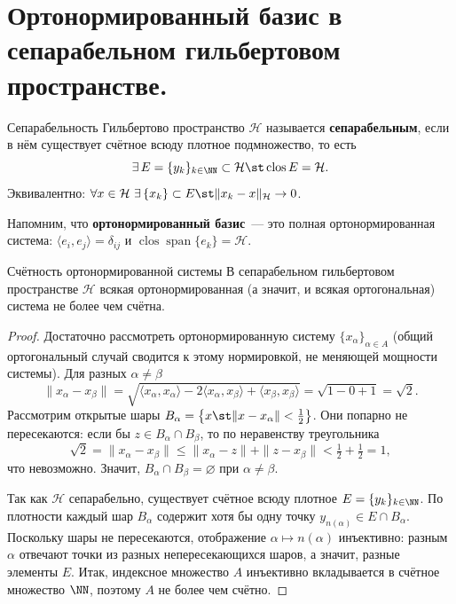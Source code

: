
\section{Ортонормированный базис в сепарабельном гильбертовом пространстве.}

\begin{Definition}{Сепарабельность}{}
	Гильбертово пространство $\mathcal{H}$ называется \textbf{сепарабельным}, если в нём существует счётное всюду плотное подмножество, то есть
	\[
	\exists\, E = \{y_k\}_{k \in \NN} \subset \mathcal{H} \st \operatorname{clos} E = \mathcal{H}.
	\]
	Эквивалентно: $\forall x \in \mathcal{H}\ \exists\,\{x_k\} \subset E \st \|x_k - x\|_{\mathcal{H}} \to 0$.
\end{Definition}

Напомним, что \textbf{ортонормированный базис}~--- это полная ортонормированная система: $\langle e_i, e_j\rangle = \delta_{ij}$ и $\operatorname{clos}\operatorname{span}\{e_k\} = \mathcal{H}$.

\begin{Theorem}{Счётность ортонормированной системы}{}
	В сепарабельном гильбертовом пространстве $\mathcal{H}$ всякая ортонормированная (а значит, и всякая ортогональная) система не более чем счётна.
\end{Theorem}

\begin{proof}
	Достаточно рассмотреть ортонормированную систему $\{x_\alpha\}_{\alpha \in A}$ (общий ортогональный случай сводится к этому нормировкой, не меняющей мощности системы). Для разных $\alpha \neq \beta$
	\[
	\|x_\alpha - x_\beta\|
	= \sqrt{\langle x_\alpha, x_\alpha\rangle - 2\langle x_\alpha, x_\beta\rangle + \langle x_\beta, x_\beta\rangle}
	= \sqrt{1 - 0 + 1} = \sqrt{2}.
	\]
	Рассмотрим открытые шары $B_\alpha = \bigl\{ x \st \|x - x_\alpha\| < \tfrac12 \bigr\}$. Они попарно не пересекаются: если бы $z \in B_\alpha \cap B_\beta$, то по неравенству треугольника
	\[
	\sqrt{2} = \|x_\alpha - x_\beta\| \le \|x_\alpha - z\| + \|z - x_\beta\| < \tfrac12 + \tfrac12 = 1,
	\]
	что невозможно. Значит, $B_\alpha \cap B_\beta = \varnothing$ при $\alpha \neq \beta$.

	Так как $\mathcal{H}$ сепарабельно, существует счётное всюду плотное $E = \{y_k\}_{k \in \NN}$. По плотности каждый шар $B_\alpha$ содержит хотя бы одну точку $y_{n(\alpha)} \in E \cap B_\alpha$. Поскольку шары не пересекаются, отображение $\alpha \mapsto n(\alpha)$ инъективно: разным $\alpha$ отвечают точки из разных непересекающихся шаров, а значит, разные элементы $E$. %
	Итак, индексное множество $A$ инъективно вкладывается в счётное множество $\NN$, поэтому $A$ не более чем счётно.
\end{proof}

